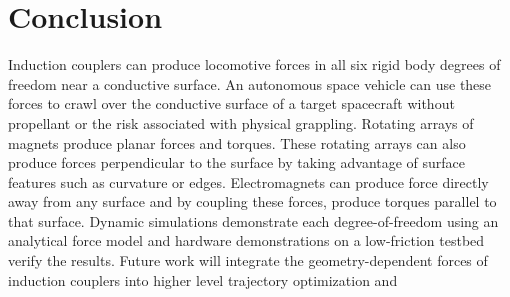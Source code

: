 \documentclass[10pt]{article}
\begin{document}
\section{Conclusion}
Induction couplers can produce locomotive forces in all six rigid body degrees of freedom near a conductive surface. An autonomous space vehicle can use these forces to crawl over the conductive surface of a target spacecraft without propellant or the risk associated with physical grappling. Rotating arrays of magnets produce planar forces and torques. These rotating arrays can also produce forces perpendicular to the surface by taking advantage of surface features such as curvature or edges. Electromagnets can produce force directly away from any surface and by coupling these forces, produce torques parallel to that surface. Dynamic simulations demonstrate each degree-of-freedom using an analytical force model and hardware demonstrations on a low-friction testbed verify the results. 
Future work will integrate the geometry-dependent forces of induction couplers into higher level trajectory optimization and      
\end{document}
